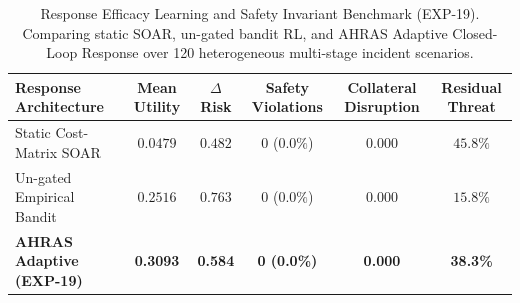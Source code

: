 \begin{table}[t]
\centering
\small
\caption{Response Efficacy Learning and Safety Invariant Benchmark (EXP-19). Comparing static SOAR, un-gated bandit RL, and AHRAS Adaptive Closed-Loop Response over 120 heterogeneous multi-stage incident scenarios.}
\label{tab:response_efficacy_eval}
\begin{tabular}{lccccc}
\toprule
\textbf{Response Architecture} & \textbf{Mean Utility} & \textbf{$\Delta$ Risk} & \textbf{Safety Violations} & \textbf{Collateral Disruption} & \textbf{Residual Threat} \\
\midrule
Static Cost-Matrix SOAR & $0.0479$ & $0.482$ & $0$ ($0.0\%$) & $0.000$ & $45.8\%$ \\
Un-gated Empirical Bandit & $0.2516$ & $0.763$ & $0$ ($0.0\%$) & $0.000$ & $15.8\%$ \\
\textbf{AHRAS Adaptive (EXP-19)} & \textbf{0.3093} & \textbf{0.584} & \textbf{0 (0.0\%)} & \textbf{0.000} & \textbf{38.3\%} \\
\bottomrule
\end{tabular}
\end{table}
